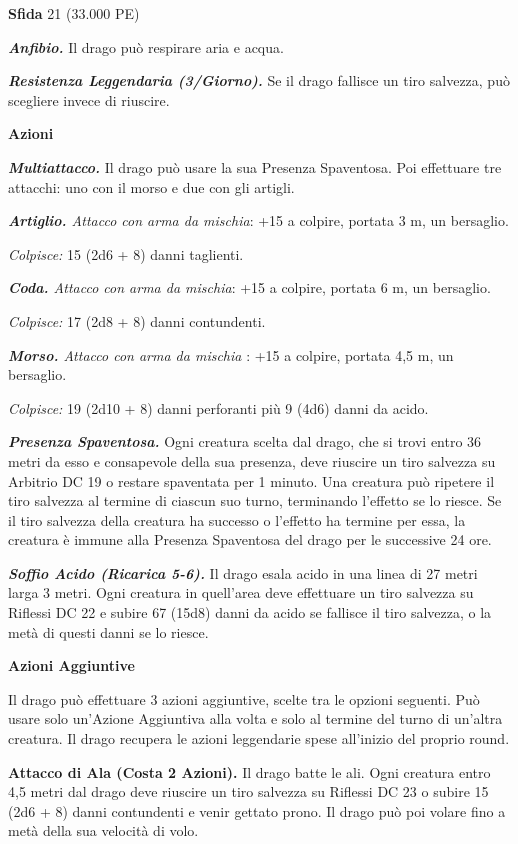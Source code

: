 \begin{multicols}{2}
\textbf{Sfida} 21 (33.000 PE)\smallskip

\emph{\textbf{Anfibio.}} Il drago può respirare aria e acqua.

\emph{\textbf{Resistenza Leggendaria (3/Giorno).}} Se il drago fallisce
un tiro salvezza, può scegliere invece di riuscire.

\smallskip\textbf{Azioni}

\emph{\textbf{Multiattacco.}} Il drago può usare la sua Presenza
Spaventosa. Poi effettuare tre attacchi: uno con il morso e due con gli
artigli.

\emph{\textbf{Artiglio.} Attacco con arma da mischia}: +15 a colpire,
portata 3 m, un bersaglio.

\emph{Colpisce:} 15 (2d6 + 8) danni taglienti.

\emph{\textbf{Coda.} Attacco con arma da mischia}: +15 a colpire,
portata 6 m, un bersaglio.

\emph{Colpisce:} 17 (2d8 + 8) danni contundenti.

\emph{\textbf{Morso.} Attacco con arma da mischia} : +15 a colpire,
portata 4,5 m, un bersaglio.

\emph{Colpisce:} 19 (2d10 + 8) danni perforanti più 9 (4d6) danni da
acido.

\emph{\textbf{Presenza Spaventosa.}} Ogni creatura scelta dal drago, che
si trovi entro 36 metri da esso e consapevole della sua presenza, deve
riuscire un tiro salvezza su Arbitrio DC 19 o restare spaventata per 1
minuto. Una creatura può ripetere il tiro salvezza al termine di ciascun
suo turno, terminando l'effetto se lo riesce. Se il tiro salvezza della
creatura ha successo o l'effetto ha termine per essa, la creatura è
immune alla Presenza Spaventosa del drago per le successive 24 ore.

\emph{\textbf{Soffio Acido (Ricarica 5-6).}} Il drago esala acido in una
linea di 27 metri larga 3 metri. Ogni creatura in quell'area deve
effettuare un tiro salvezza su Riflessi DC 22 e subire 67 (15d8) danni
da acido se fallisce il tiro salvezza, o la metà di questi danni se lo
riesce.

\textbf{Azioni Aggiuntive}

Il drago può effettuare 3 azioni aggiuntive, scelte tra le opzioni
seguenti. Può usare solo un'Azione Aggiuntiva alla volta e solo al
termine del turno di un'altra creatura. Il drago recupera le azioni
leggendarie spese all'inizio del proprio round.

\textbf{Attacco di Ala (Costa 2 Azioni).} Il drago batte le ali. Ogni
creatura entro 4,5 metri dal drago deve riuscire un tiro salvezza su Riflessi DC 23 o subire 15 (2d6 + 8) danni contundenti e venir gettato
prono. Il drago può poi volare fino a metà della sua velocità di volo.


\end{multicols}
